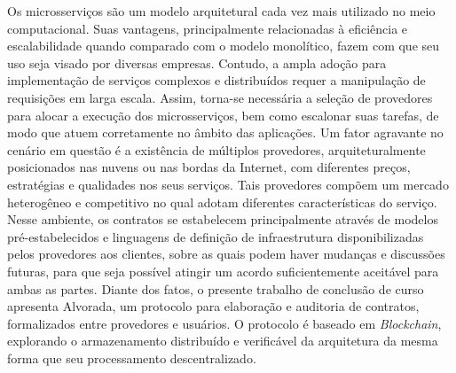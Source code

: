 

\bacharelado {}
\data {\today}




\newpage
\pagestyle{empty}

\maketitle



\noindent Os microsserviços são um modelo arquitetural cada vez mais utilizado no meio computacional. Suas vantagens, principalmente relacionadas à eficiência e escalabilidade quando comparado com o modelo monolítico, fazem com que seu uso seja visado por diversas empresas.
%
Contudo, a ampla adoção para implementação de serviços complexos e distribuídos requer a manipulação de requisições em larga escala.
%
Assim, torna-se necessária a seleção de provedores para alocar a execução dos microsserviços, bem como escalonar suas tarefas, de modo que atuem corretamente no âmbito das aplicações.
%
Um fator agravante no cenário em questão é a existência de múltiplos provedores, arquiteturalmente posicionados nas nuvens ou nas bordas da Internet, com diferentes preços, estratégias e qualidades nos seus serviços.
%
Tais provedores compõem um mercado heterogêneo e competitivo no qual adotam diferentes características do serviço.
%
Nesse ambiente, os contratos se estabelecem principalmente através de modelos pré-estabelecidos e linguagens de definição de infraestrutura disponibilizadas pelos provedores aos clientes, sobre as quais podem haver mudanças e discussões futuras, para que seja possível atingir um acordo suficientemente aceitável para ambas as partes.
%
Diante dos fatos, o presente trabalho de conclusão de curso apresenta Alvorada, um protocolo para elaboração e auditoria de contratos, formalizados entre provedores e usuários.
%
O protocolo é baseado em \textit{Blockchain}, explorando o armazenamento distribuído e verificável da arquitetura da mesma forma que seu processamento descentralizado.

